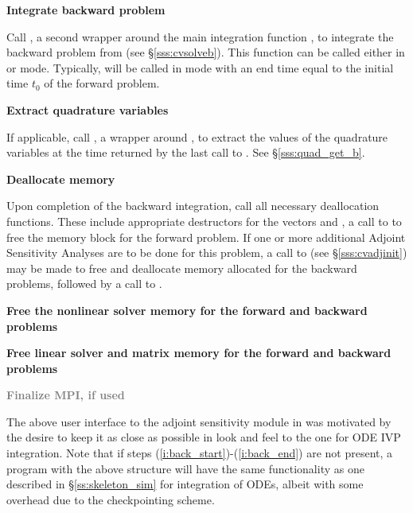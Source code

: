 \begin{Steps}
\item
  {\bf Integrate backward problem}

  Call , a second wrapper around the {\cvodes} main integration
  function , to integrate the backward problem from 
  (see \S\ref{sss:cvsolveb}). This function can be called either in 
  or  mode. Typically,  will be called in 
  mode with an end time equal to the initial time $t_0$ of the forward problem.

\item \label{i:back_end}
  {\bf Extract quadrature variables}

  If applicable, call , a wrapper around ,
  to extract the values of the quadrature variables at the time returned
  by the last call to . See \S\ref{sss:quad_get_b}.

\item
  {\bf Deallocate memory}

  Upon completion of the backward integration, call all necessary deallocation
  functions. These include appropriate destructors for the vectors
   and , a call to  to free the {\cvodes} memory block
  for the forward problem.  If one or more additional Adjoint
  Sensitivity Analyses are
  to be done for this problem, a call to  (see \S\ref{sss:cvadjinit})
  may be made to free and deallocate memory allocated for the backward problems,
  followed by a call to .

\item
  {\bf Free the nonlinear solver memory for the forward and backward problems}

\item
  {\bf Free linear solver and matrix memory for the forward and backward problems}

\item
  \textcolor{gray}{\bf Finalize MPI, if used}

\end{Steps}

The above user interface to the adjoint sensitivity module in {\cvodes} was motivated by
the desire to keep it as close as possible in look and feel to the one for ODE IVP
integration. Note that if steps (\ref{i:back_start})-(\ref{i:back_end}) are not present,
a program with the above structure will have the same functionality as one described in
\S\ref{ss:skeleton_sim} for integration of ODEs, albeit with some overhead due to
the checkpointing scheme.

